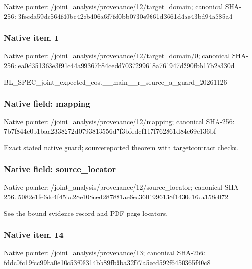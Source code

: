 \documentclass[10pt,a4paper]{article}
\begin{document}
Native pointer: /joint\_analysis/provenan\allowbreak{}ce/12/target\_domain; canonical SHA-256: 3fecda59dc564f40bc42cb40\allowbreak{}6a6f7fd0bb0730e9661d3661\allowbreak{}d4ae43bd94a385a4



\subsubsection{Native item 1}


Native pointer: /joint\_analysis/provenan\allowbreak{}ce/12/target\_domain/0; canonical SHA-256: ea0d351363e3f91c44a99367\allowbreak{}b84cedd7037299618a761947\allowbreak{}d290fbb17b2e330d


BL\_SPEC\_joint\_expected\_c\allowbreak{}ost\_\_main\_\_r\_source\_a\_gu\allowbreak{}ard\_20261126


\subsubsection{Native field: mapping}


Native pointer: /joint\_analysis/provenance/12/mapping; canonical SHA-256: 7b7f844c0b1baa2338272d07\allowbreak{}93813556d7f3bfddcf117f76\allowbreak{}2861d84e69e136bf


Exact stated native guard; sourcereported theorem with targetcontract checks.


\subsubsection{Native field: source\_locator}


Native pointer: /joint\_analysis/provenan\allowbreak{}ce/12/source\_locator; canonical SHA-256: 5082e1fe6dc4f45bc28e108c\allowbreak{}ed287881ae6ec3601996138f\allowbreak{}1430c16ca158c072


See the bound evidence record and PDF page locators.


\subsubsection{Native item 14}


Native pointer: /joint\_analysis/provenance/13; canonical SHA-256: fddc0fc19fcc99ba0e10c53f\allowbreak{}08314bb89fb9ba32f77a5ccd\allowbreak{}592f6450365f40c8
\end{document}
